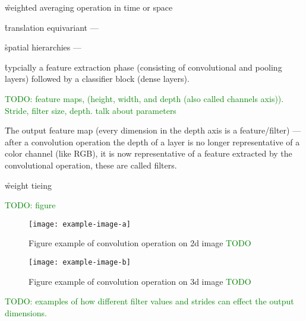 



\r{weighted averaging operation in time or space}


\r{translation equivariant --- }


\r{spatial hierarchies --- }


\r{typcially a feature extraction phase (consisting of convolutional and pooling layers) followed by a classifier block (dense layers).}

\textcolor{green}{TODO: feature maps, (height, width, and depth (also called channels axis)). Stride, filter size, depth. talk about parameters}

\r{The output feature map (every dimension in the depth axis is a feature/filter) --- after a convolution operation the depth of a layer is no longer representative of a color channel (like RGB), it is now representative of a feature extracted by the convolutional operation, these are called filters.}



\r{weight tieing}


\textcolor{green}{TODO: figure}

\begin{figure}[htp]
	\centering
	\texttt{[image: example-image-a]}\hfil
	\caption{Figure example of convolution operation on 2d image \textcolor{green}{TODO}}
	\label{fig:conv_2d_example_calc}
\end{figure}

\begin{figure}[htp]
	\centering
	\texttt{[image: example-image-b]}\hfil
	\caption{Figure example of convolution operation on 3d image \textcolor{green}{TODO}}
	\label{fig:conv_2d_depth_example_calc}
\end{figure}

\textcolor{green}{TODO: examples of how different filter values and strides can effect the output dimensions.}




